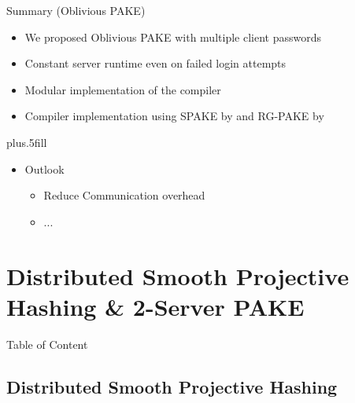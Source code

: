 \documentclass[notes,xcolor=dvipsnames]{beamer}
\begin{document}
\begin{frame}{Summary (Oblivious PAKE)}

  \begin{itemize}
  \item We proposed \alert{Oblivious PAKE} with multiple client passwords
  \item \alert{Constant server runtime} even on failed login attempts
  \item \alert{Modular implementation} of the compiler
  \item Compiler implementation using SPAKE by \cite{Abdalla2005} and RG-PAKE by \cite{Gennaro2008}
  \end{itemize}
  
  \vskip0pt plus.5fill
  \begin{itemize}
  \item
    Outlook
    \begin{itemize}
    \item Reduce Communication overhead
    \item ...
    \end{itemize}
  \end{itemize}
\end{frame}


\section{Distributed Smooth Projective Hashing \& 2-Server PAKE}

\begin{frame}{Table of Content}
\tableofcontents[currentsection]
\end{frame}

\subsection{Distributed Smooth Projective Hashing}
\end{document}
